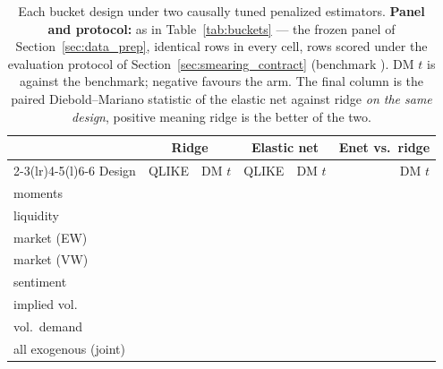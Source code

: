 \begin{table}[H]
\centering
\small
\caption{Each bucket design under two causally tuned penalized
estimators. \textbf{Panel and protocol:} as in Table~\ref{tab:buckets}
--- the frozen panel of Section~\ref{sec:data_prep}, identical rows in
every cell, rows scored under the evaluation protocol of
Section~\ref{sec:smearing_contract} (benchmark \unifAzeroQLIKE{}). DM $t$ is against the benchmark; negative
favours the arm. The final column is the paired Diebold--Mariano
statistic of the elastic net against ridge \emph{on the same design},
positive meaning ridge is the better of the two.}
\label{tab:buckets_tuned}
\begin{tabular}{@{}lrrrrr@{}}
\toprule
& \multicolumn{2}{c}{Ridge} & \multicolumn{2}{c}{Elastic net} & Enet vs.\ ridge \\
\cmidrule(lr){2-3}\cmidrule(lr){4-5}\cmidrule(l){6-6}
Design & QLIKE & DM $t$ & QLIKE & DM $t$ & DM $t$ \\
\midrule
moments      & \unifBrTunedMomentsQLIKE{}    & \unifBrTunedMomentsDM{}    & \unifBeTunedMomentsQLIKE{}    & \unifBeTunedMomentsDM{}    & \unifIncrBeTunedMomentsDM{} \\
liquidity    & \unifBrTunedLiquidityQLIKE{}  & \unifBrTunedLiquidityDM{}  & \unifBeTunedLiquidityQLIKE{}  & \unifBeTunedLiquidityDM{}  & \unifIncrBeTunedLiquidityDM{} \\
market (EW)  & \unifBrTunedMarketEwQLIKE{}   & \unifBrTunedMarketEwDM{}   & \unifBeTunedMarketEwQLIKE{}   & \unifBeTunedMarketEwDM{}   & \unifIncrBeTunedMarketEwDM{} \\
market (VW)  & \unifBrTunedMarketVwQLIKE{}   & \unifBrTunedMarketVwDM{}   & \unifBeTunedMarketVwQLIKE{}   & \unifBeTunedMarketVwDM{}   & \unifIncrBeTunedMarketVwDM{} \\
sentiment    & \unifBrTunedSentimentQLIKE{}  & \unifBrTunedSentimentDM{}  & \unifBeTunedSentimentQLIKE{}  & \unifBeTunedSentimentDM{}  & \unifIncrBeTunedSentimentDM{} \\
implied vol. & \unifBrTunedImpliedVolQLIKE{} & \unifBrTunedImpliedVolDM{} & \unifBeTunedImpliedVolQLIKE{} & \unifBeTunedImpliedVolDM{} & \unifIncrBeTunedImpliedVolDM{} \\
vol.\ demand & \unifBrTunedVolDemandQLIKE{}  & \unifBrTunedVolDemandDM{}  & \unifBeTunedVolDemandQLIKE{}  & \unifBeTunedVolDemandDM{}  & \unifIncrBeTunedVolDemandDM{} \\
\midrule
all exogenous (joint) & \unifBrTunedAllFeaturesQLIKE{} & \unifBrTunedAllFeaturesDM{} & \unifBeTunedAllFeaturesQLIKE{} & \unifBeTunedAllFeaturesDM{} & \unifIncrBeTunedAllFeaturesDM{} \\
\bottomrule
\end{tabular}
\end{table}

